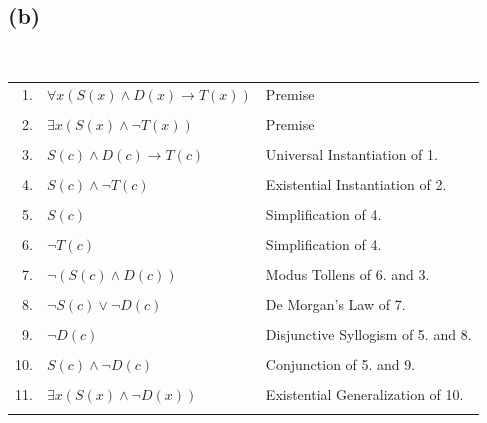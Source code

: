\documentclass[a4paper,12pt]{article}
\begin{document}
\subsection{(b)}
\,\\
\begin{tabular}{rll}
    1. & $\forall x(S(x) \land D(x) \rightarrow T(x))$ & Premise\\\\
    2. & $\exists x(S(x) \land \neg T(x))$ & Premise\\\\
    3. & $S(c) \land D(c) \rightarrow T(c)$ & Universal Instantiation of 1.\\\\
    4. & $S(c) \land \neg T(c)$ & Existential Instantiation of 2.\\\\
    5. & $S(c)$ & Simplification of 4.\\\\
    6. & $\neg T(c)$ & Simplification of 4.\\\\
    7. & $\neg (S(c) \land D(c))$ & Modus Tollens of 6. and 3.\\\\
    8. & $\neg S(c) \lor \neg D(c)$ & De Morgan's Law of 7.\\\\
    9. & $\neg D(c)$ & Disjunctive Syllogism of 5. and 8.\\\\
    10. & $S(c) \land \neg D(c)$ & Conjunction of 5. and 9.\\\\
    11. & $\exists x (S(x) \land \neg D(x))$ & Existential Generalization of 10.\\\\
\end{tabular}
\end{document}
